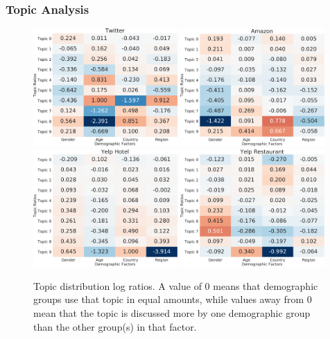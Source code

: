 \subsubsection{Topic Analysis}

\begin{figure}[t!]
\centering
\includegraphics[width=0.49\textwidth]{./images/chapter4/twitter_ratio.pdf}
\includegraphics[width=0.49\textwidth]{./images/chapter4/amazon_ratio.pdf}
\newline
\includegraphics[width=0.49\textwidth]{./images/chapter4/yelp_hotel_ratio.pdf}
\includegraphics[width=0.49\textwidth]{./images/chapter4/yelp_rest_ratio.pdf}
\caption{Topic distribution log ratios. A value of 0 means that demographic groups use that topic in equal amounts, while values away from 0 mean that the topic is discussed more by one demographic group than the other group(s) in that factor.
}
\label{chap4:fig:vary}
\end{figure}

